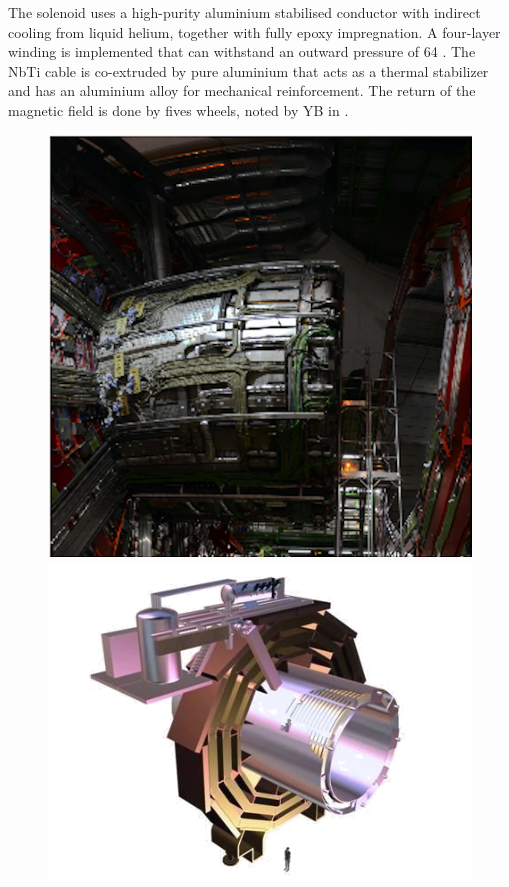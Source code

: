 	The solenoid uses a high-purity aluminium stabilised conductor with indirect cooling from liquid helium, together with fully epoxy impregnation. A four-layer winding is implemented that can withstand an outward pressure of 64 \si{ \atm}. The NbTi cable is co-extruded by pure aluminium that acts as a thermal stabilizer and has an aluminium alloy for mechanical reinforcement. The return of the magnetic field is done by fives wheels, noted by YB in .
	\begin{figure}[htbp]
		\centering
		\begin{minipage}{0.6\textwidth}
		\includegraphics[width=1.\textwidth]{2_ExperimentalSetup/Figures/solenoid.png}
	\end{minipage}
		\begin{minipage}{0.39\textwidth}
		\includegraphics[width=\textwidth]{2_ExperimentalSetup/Figures/839_1a}

\end{minipage}
\end{figure}
